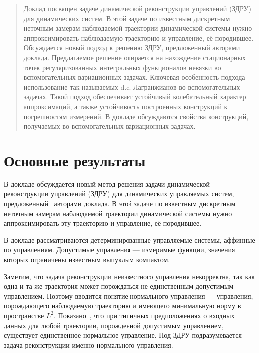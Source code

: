 \begin{abstract}
Доклад посвящен задаче динамической реконструкции управлений (ЗДРУ) для динамических систем. В этой задаче по известным дискретным неточным замерам наблюдаемой траектории динамической системы нужно аппроксимировать наблюдаемую траекторию и управление, её породившее. Обсуждается новый подход к решению ЗДРУ, предложенный авторами доклада. Предлагаемое решение опирается на нахождение стационарных точек регуляризованных интегральных функционалов невязки во вспомогательных вариационных задачах. Ключевая особенность подхода --- использование так называемых d.c. Лагранжианов во вспомогательных задачах. Такой подход обеспечивает устойчивый колебательный характер аппроксимаций, а также устойчивость построенных конструкций к погрешностям измерений. В докладе обсуждаются свойства конструкций, получаемых во вспомогательных вариационных задачах.

\end{abstract}

\section{Основные результаты} %

В докладе обсуждается новый метод решения задачи динамической реконструкции управлений (ЗДРУ) для динамических управляемых систем, предложенный~\cite{Subbotina:uran,Subbotina:mian} авторами доклада. В этой задаче по известным дискретным неточным замерам наблюдаемой траектории динамической системы нужно аппроксимировать эту траекторию и управление, её породившее.

В докладе рассматриваются детерминированные управляемые системы, аффинные по управлениям. Допустимые управления --- измеримые функции, значения которых ограничены известным выпуклым компактом.

Заметим, что задача реконструкции неизвестного управления некорректна, так как одна и та же траектория может порождаться не единственным допустимым управлением. Поэтому вводится понятие нормального управления --- управления, порождающего наблюдаемую траекторию и имеющего минимальную норму в пространстве $L^2$. Показано~\cite{Subbotina:mian}, что при типичных предположениях о входных данных для любой траектории, порожденной допустимым управлением, существует единственное нормальное управление. Под ЗДРУ подразумевается задача реконструкции именно нормального управления.

